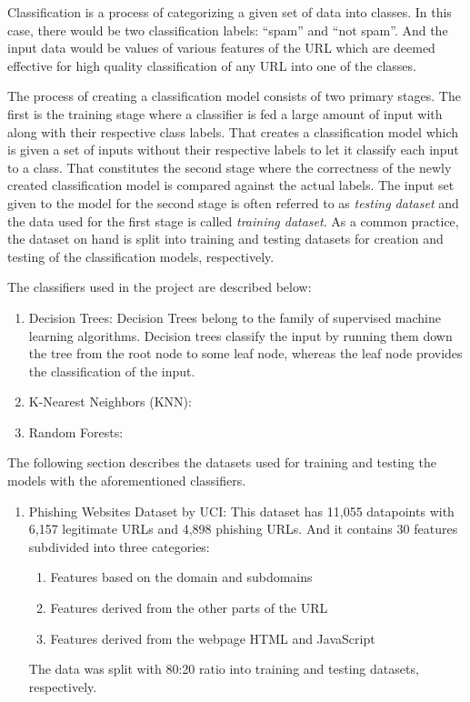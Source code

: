\documentclass[conference]{IEEEtran}
\begin{document}
\par Classification is a process of categorizing a given set of data into classes.
In this case, there would be two classification labels: ``spam'' and ``not spam''.
And the input data would be values of various features of the URL which are deemed effective for high quality classification of any URL into one of the classes.


\par The process of creating a classification model consists of two primary stages.
The first is the training stage where a classifier is fed a large amount of input with along with their respective class labels.
That creates a classification model which is given a set of inputs without their respective labels to let it classify each input to a class.
That constitutes the second stage where the correctness of the newly created classification model is compared against the actual labels.
The input set given to the model for the second stage is often referred to as \emph{testing dataset} and the data used for the first stage is called \emph{training dataset}.
As a common practice, the dataset on hand is split into training and testing datasets for creation and testing of the classification models, respectively.

\par The classifiers used in the project are described below:
\begin{enumerate}
    \item Decision Trees:
          Decision Trees belong to the family of supervised machine learning algorithms.
          Decision trees classify the input by running them down the tree from the root node to some leaf node, whereas the leaf node provides the classification of the input.
    \item K-Nearest Neighbors (KNN):
    \item Random Forests:
\end{enumerate}

\par The following section describes the datasets used for training and testing the models with the aforementioned classifiers.
\begin{enumerate}
    \item Phishing Websites Dataset by UCI\cite{UCIDataset}:
          This dataset has 11,055 datapoints with 6,157 legitimate URLs and 4,898 phishing URLs.
          And it contains 30 features subdivided into three categories:
          \begin{enumerate}
              \item Features based on the domain and subdomains
              \item Features derived from the other parts of the URL
              \item Features derived from the webpage HTML and JavaScript
          \end{enumerate}
          The data was split with 80:20 ratio into training and testing datasets, respectively.

\end{enumerate}
\end{document}
